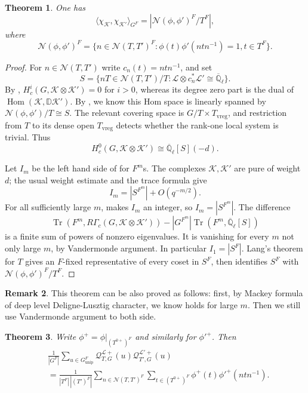 \documentclass[11pt,letterpaper]{amsart}
\newtheorem{theorem}{Theorem}
\theoremstyle{definition}
\newtheorem{remark}[theorem]{Remark}
\numberwithin{equation}{section}
\numberwithin{theorem}{section}
\begin{document}
\begin{theorem}\label{orth-ind}
One has
\begin{equation}\label{ind-orth}
 \langle \chi_{\mathcal K},\chi_{\mathcal K'}\rangle_{G^F}
 =|\mathcal N(\phi,\phi')^F/T^F|,
\end{equation}
where
\[
 \mathcal N(\phi,\phi')^F
 =\{n\in\mathcal N(T,T')^F:
       \phi(t)\phi'(ntn^{-1})=1, t\in T^F\}.
\]
\end{theorem}
\begin{proof}
For $n\in\mathcal N(T,T')$ write $c_n(t)=ntn^{-1}$, and set
\[
 S=\{nT\in\mathcal N(T,T')/T:
              \mathcal L\otimes c_n^*\mathcal L'\cong
              \overline{\mathbb Q}_\ell\}.
\]
By \cite[\S7.4]{Lus_Ch2}, $H_c^i(G,\mathcal K\otimes\mathcal K')=0$
for $i>0$, whereas its degree zero part is the dual of
$\operatorname{Hom}(\mathcal K,\mathbb D\mathcal K')$.
By
\cite[\S 5]{INY25}, we know this Hom space is linearly spanned by
$\mathcal N(\phi,\phi')/T\cong S$. The relevant
covering space is $G/T\times T_{\mathrm{vreg}}$, and restriction
from $T$ to its dense open $T_{\mathrm{vreg}}$
detects whether the rank-one local system is trivial. Thus
\[
 H_c^0(G,\mathcal K\otimes\mathcal K')
       \cong\overline{\mathbb Q}_\ell[S](-d).
\]

Let $I_m$ be the left hand side of  for $F^m$s.
The complexes $\mathcal K,\mathcal K'$ are pure of weight $d$;
the usual weight estimate \cite{Deligne_80} and the trace formula give
\[
 I_m=|S^{F^m}|+O(q^{-m/2}).
\]
For all sufficiently large $m$,  makes $I_m$ an integer,
so $I_m=|S^{F^m}|$. The difference
\[
 \operatorname{Tr}(F^m,R\Gamma_c(G,\mathcal K\otimes\mathcal K'))
       -|G^{F^m}|\operatorname{Tr}(F^m,\overline{\mathbb Q}_\ell[S])
\]
is a finite sum of powers of nonzero eigenvalues. It is vanishing for every $m$ not only large $m$, by Vandermonde
argument. In particular $I_1=|S^F|$. Lang's theorem for $T$ gives
an $F$-fixed representative of every coset in $S^F$, then identifies $S^F$ with
$\mathcal N(\phi,\phi')^F/T^F$.
\end{proof}
\begin{remark}
    This theorem can be also proved as follows: first, by Mackey formula of deep level Deligne-Lusztig character, we know  holds for large $m$. Then we still use Vandermonde
argument to both side.
\end{remark}
\begin{theorem}\label{orth-green}
Write $\phi^+=\phi|_{(T^{0+})^F}$ and similarly for $\phi'^+$.
Then
\begin{equation}\label{green-orth}
\begin{aligned}
 &\frac1{|G^F|}\sum_{u\in G^F_{\mathrm{unip}}}
 \mathcal Q_{T,G}^{\mathcal L+}(u)\mathcal Q_{T',G}^{\mathcal L'+}(u)\\
 &=\frac1{|T^F|\,|(T')^F|}
 \sum_{n\in\mathcal N(T,T')^F}\sum_{t\in(T^{0+})^F}
                    \phi^+(t)\phi'^+(ntn^{-1}).
\end{aligned}
\end{equation}
\end{theorem}
\end{document}
